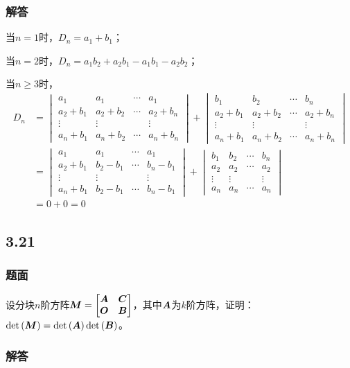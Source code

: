 \documentclass[10pt,xcolor=svgnames]{beamer} %
\begin{document}
\begin{frame}
    \frametitle{解答}
    当\(n=1\)时，\(D_n=a_1+b_1\)；

    当\(n=2\)时，\(D_n=a_1b_2+a_2b_1-a_1b_1-a_2b_2\)；
    \pause

    当\(n\geq3\)时，
    \begin{align*}
        D_n & =
        \begin{vmatrix}
            a_{1}       & a_{1}       & \cdots & a_{1}       \\
            a_{2}+b_{1} & a_{2}+b_{2} & \cdots & a_{2}+b_{n} \\
            \vdots      & \vdots      &        & \vdots      \\
            a_{n}+b_{1} & a_{n}+b_{2} & \cdots & a_{n}+b_{n}
        \end{vmatrix}+
        \begin{vmatrix}
            b_{1}       & b_{2}       & \cdots & b_{n}       \\
            a_{2}+b_{1} & a_{2}+b_{2} & \cdots & a_{2}+b_{n} \\
            \vdots      & \vdots      &        & \vdots      \\
            a_{n}+b_{1} & a_{n}+b_{2} & \cdots & a_{n}+b_{n}
        \end{vmatrix} \\
            & =
        \begin{vmatrix}
            a_{1}       & a_{1}       & \cdots & a_{1}       \\
            a_{2}+b_{1} & b_{2}-b_{1} & \cdots & b_{n}-b_{1} \\
            \vdots      & \vdots      &        & \vdots      \\
            a_{n}+b_{1} & b_{2}-b_{1} & \cdots & b_{n}-b_{1}
        \end{vmatrix}+
        \begin{vmatrix}
            b_{1}  & b_{2}  & \cdots & b_{n}  \\
            a_{2}  & a_{2}  & \cdots & a_{2}  \\
            \vdots & \vdots &        & \vdots \\
            a_{n}  & a_{n}  & \cdots & a_{n}
        \end{vmatrix}                \\
            & =0+0=0
    \end{align*}
\end{frame}

\subsection*{3.21}
\begin{frame}
    \frametitle{题面}
    设分块\(n\)阶方阵\(\boldsymbol{M}=\begin{bmatrix}\boldsymbol{A}&\boldsymbol{C}\\\boldsymbol{O}&\boldsymbol{B}\end{bmatrix}\)，其中\(\boldsymbol{A}\)为\(k\)阶方阵，证明：\(\mathrm{det}\left( \boldsymbol{M} \right)=\mathrm{det}\left( \boldsymbol{A} \right)\mathrm{det}\left( \boldsymbol{B} \right)\)。
\end{frame}
\begin{frame}
    \frametitle{解答}
\end{frame}
\end{document}
